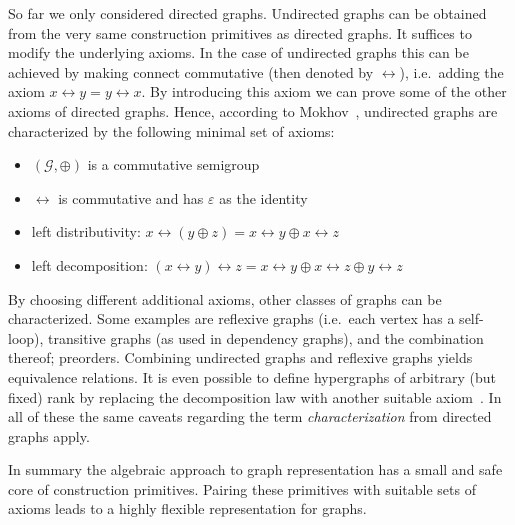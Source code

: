 \documentclass{article}
\renewcommand{\epsilon}{\varepsilon}
\newcommand{\eps}{\epsilon}
\begin{document}
So far we only considered directed graphs. Undirected graphs can be
obtained from the very same construction primitives as directed graphs. It suffices
to modify the underlying axioms. In the case of undirected graphs this can be
achieved by making connect commutative (then denoted by $\leftrightarrow$),
i.e.\ adding the axiom $x \leftrightarrow y = y \leftrightarrow x$. By
introducing this axiom we can prove some of the other axioms of directed graphs.
Hence, according to Mokhov~\cite{mokhov2017algebraic}, undirected graphs are
characterized by the following minimal set of axioms:
\begin{itemize}
\item $(\mathcal{G}, \oplus)$ is a commutative semigroup
\item $\leftrightarrow$ is commutative and has $\eps$ as the identity
\item left distributivity: $x \leftrightarrow (y \oplus z) = x \leftrightarrow
  y \oplus x \leftrightarrow z$
\item left decomposition: $(x \leftrightarrow y) \leftrightarrow z = x
  \leftrightarrow y \oplus x \leftrightarrow z \oplus y \leftrightarrow z$
\end{itemize}
By choosing different additional axioms, other classes of graphs can be
characterized. Some examples are reflexive graphs (i.e.\ each vertex has a
self-loop), transitive graphs (as used in dependency graphs), and the combination
thereof; preorders. Combining undirected graphs and reflexive graphs yields
equivalence relations. It is even possible to define hypergraphs of arbitrary
(but fixed) rank by replacing the decomposition law with another suitable
axiom~\cite{mokhov2017algebraic}. In all of these the same caveats regarding the
term \emph{characterization} from directed graphs apply.

In summary the algebraic approach to graph representation has a small and safe
core of construction primitives. Pairing these primitives with suitable sets of
axioms leads to a highly flexible representation for graphs.
\end{document}
